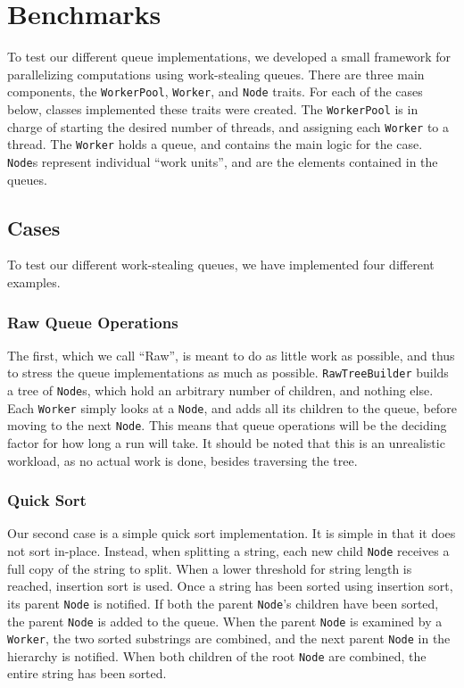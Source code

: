 \section{Benchmarks}
To test our different queue implementations, we developed a small framework for parallelizing computations using work-stealing queues. There are three main components, the \texttt{WorkerPool}, \texttt{Worker}, and \texttt{Node} traits. For each of the cases below, classes implemented these traits were created. The \texttt{WorkerPool} is in charge of starting the desired number of threads, and assigning each \texttt{Worker} to a thread. The \texttt{Worker} holds a queue, and contains the main logic for the case. \texttt{Node}s represent individual ``work units'', and are the elements contained in the queues.

\label{sec:benchmarks}
\subsection{Cases}
To test our different work-stealing queues, we have implemented four different examples.
\subsubsection{Raw Queue Operations} %
The first, which we call ``Raw'', is meant to do as little work as possible, and thus to stress the queue implementations as much as possible. \texttt{RawTreeBuilder} builds a tree of \texttt{Node}s, which hold an arbitrary number of children, and nothing else. Each \texttt{Worker} simply looks at a \texttt{Node}, and adds all its children to the queue, before moving to the next \texttt{Node}. This means that queue operations will be the deciding factor for how long a run will take. It should be noted that this is an unrealistic workload, as no actual work is done, besides traversing the tree.

\subsubsection{Quick Sort} %
Our second case is a simple quick sort implementation. It is simple in that it does not sort in-place. Instead, when splitting a string, each new child \texttt{Node} receives a full copy of the string to split. When a lower threshold for string length is reached, insertion sort is used. Once a string has been sorted using insertion sort, its parent \texttt{Node} is notified. If both the parent \texttt{Node}'s children have been sorted, the parent \texttt{Node} is added to the queue. When the parent \texttt{Node} is examined by a \texttt{Worker}, the two sorted substrings are combined, and the next parent \texttt{Node} in the hierarchy is notified. When both children of the root \texttt{Node} are combined, the entire string has been sorted.

